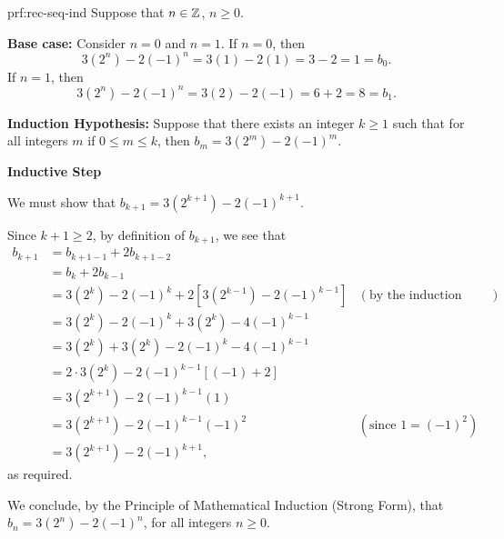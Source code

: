 \begin{prf}{prf:rec-seq-ind} 
Suppose that $n \in \mathbb Z$, $n\geq 0$.

\noindent\textbf{Base case:} Consider $n=0$ and $n=1$.
If $n=0$, then \[3(2^n) - 2(-1)^n = 3(1) - 2(1) = 3-2 = 1 = b_0.\]
If $n=1$, then\[3(2^n) - 2(-1)^n = 3(2) - 2(-1) = 6+2 = 8 = b_1.\]

\noindent\textbf{Induction Hypothesis:} Suppose that there exists an integer $k\geq 1$ such that for all integers $m$ if $0 \leq m \leq k$, then $b_m  = 3 (2^m) - 2(-1)^m$.

\noindent\textbf{Inductive Step}

We must show that $b_{k+1} = 3 (2^{k+1}) - 2(-1)^{k+1}$.

Since $k+1 \geq 2$, by definition of $b_{k+1}$, we see that
\begin{align*}
	b_{k+1} & = b_{k+1-1} + 2b_{k+1-2}	\\
			& = b_{k} + 2 b_{k-1} \\
			& = 3 (2^k) - 2(-1)^k + 2[ 3 (2^{k-1}) - 2(-1)^{k-1} ] & (\text{by the induction hypothesis})\\
			& = 3(2^k) - 2(-1)^k + 3(2^k) - 4(-1)^{k-1} \\
			& = 3(2^k) + 3(2^k) - 2(-1)^k -4(-1)^{k-1}\\
			& = 2\cdot 3(2^k) -2(-1)^{k-1}[(-1) + 2] \\
			& = 3(2^{k+1}) - 2(-1)^{k-1}(1) \\
			& = 3(2^{k+1}) - 2(-1)^{k-1}(-1)^2 & (\text{since $1=(-1)^2$})\\ 
			& = 3(2^{k+1}) - 2(-1)^{k+1},
\end{align*}
as required.  

We conclude, by the Principle of Mathematical Induction (Strong Form), that $b_n = 3 (2^n) - 2(-1)^n$, for all integers $n\geq 0$.	

\end{prf}